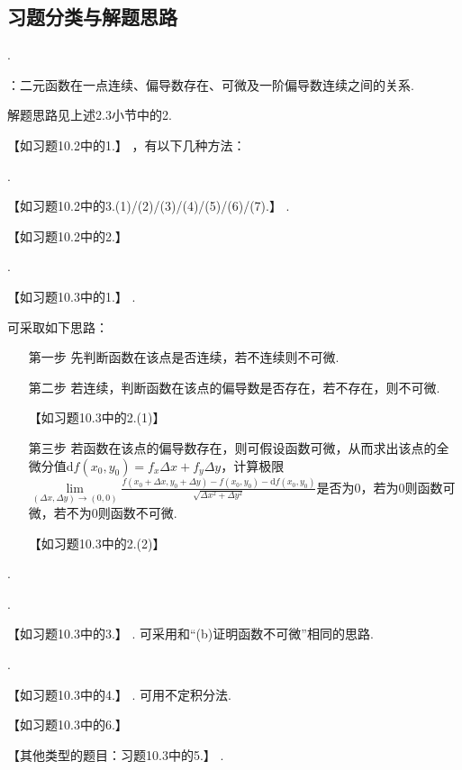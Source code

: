 \documentclass[12pt,UTF8]{ctexart}
\begin{document}
\subsection{习题分类与解题思路}
\begin{enumerate}
.
\begin{enumerate}
：二元函数在一点连续、偏导数存在、可微及一阶偏导数连续之间的关系.

解题思路见上述2.3小节中的2.

【如习题10.2中的1.】
，有以下几种方法：
\begin{enumerate}
.

【如习题10.2中的3.(1)/(2)/(3)/(4)/(5)/(6)/(7).】
.

【如习题10.2中的2.】
\end{enumerate}
\end{enumerate}
\begin{enumerate}
.

【如习题10.3中的1.】
.

可采取如下思路：
\begin{enumerate}
\item[第一步]先判断函数在该点是否连续，若不连续则不可微.
\item[第二步]若连续，判断函数在该点的偏导数是否存在，若不存在，则不可微.

【如习题10.3中的2.(1)】
\item[第三步]若函数在该点的偏导数存在，则可假设函数可微，从而求出该点的全微分值$\mathrm df(x_0,y_0)=f_x\Delta x+f_y\Delta y$，计算极限$\lim\limits_{(\Delta x,\Delta y)\rightarrow(0,0)}\frac{f(x_0+\Delta x,y_0+\Delta y)-f(x_0,y_0)-\mathrm df(x_0,y_0)}{\sqrt{\Delta x^2+\Delta y^2}}$是否为$0$，若为$0$则函数可微，若不为$0$则函数不可微.

【如习题10.3中的2.(2)】
\end{enumerate}

.

\begin{enumerate}
.

【如习题10.3中的3.】
. 可采用和“(b)证明函数不可微”相同的思路.
\end{enumerate}
.

【如习题10.3中的4.】
. 可用不定积分法.

【如习题10.3中的6.】
\end{enumerate}
【其他类型的题目：习题10.3中的5.】
.


\end{enumerate}
\end{document}
